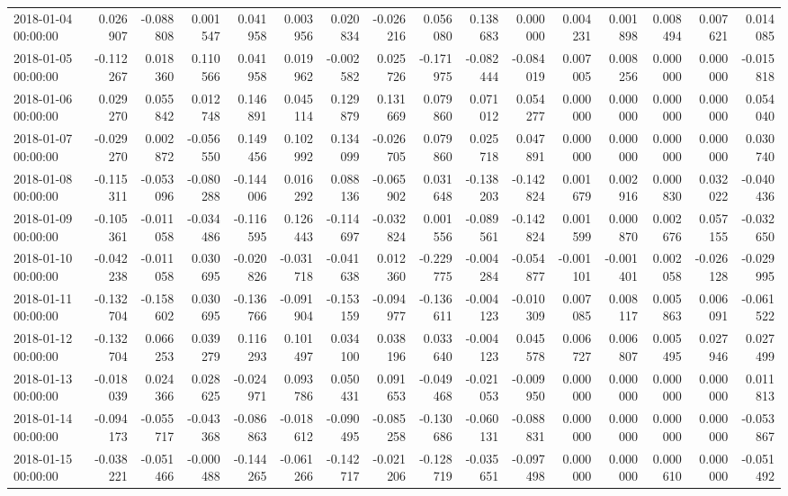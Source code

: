 \begin{tabular}{lrrrrrrrrrrrrrrr}
2018-01-04 00:00:00 & 0.026907 & -0.088808 & 0.001547 & 0.041958 & 0.003956 & 0.020834 & -0.026216 & 0.056080 & 0.138683 & 0.000000 & 0.004231 & 0.001898 & 0.008494 & 0.007621 & 0.014085 \\
2018-01-05 00:00:00 & -0.112267 & 0.018360 & 0.110566 & 0.041958 & 0.019962 & -0.002582 & 0.025726 & -0.171975 & -0.082444 & -0.084019 & 0.007005 & 0.008256 & 0.000000 & 0.000000 & -0.015818 \\
2018-01-06 00:00:00 & 0.029270 & 0.055842 & 0.012748 & 0.146891 & 0.045114 & 0.129879 & 0.131669 & 0.079860 & 0.071012 & 0.054277 & 0.000000 & 0.000000 & 0.000000 & 0.000000 & 0.054040 \\
2018-01-07 00:00:00 & -0.029270 & 0.002872 & -0.056550 & 0.149456 & 0.102992 & 0.134099 & -0.026705 & 0.079860 & 0.025718 & 0.047891 & 0.000000 & 0.000000 & 0.000000 & 0.000000 & 0.030740 \\
2018-01-08 00:00:00 & -0.115311 & -0.053096 & -0.080288 & -0.144006 & 0.016292 & 0.088136 & -0.065902 & 0.031648 & -0.138203 & -0.142824 & 0.001679 & 0.002916 & 0.000830 & 0.032022 & -0.040436 \\
2018-01-09 00:00:00 & -0.105361 & -0.011058 & -0.034486 & -0.116595 & 0.126443 & -0.114697 & -0.032824 & 0.001556 & -0.089561 & -0.142824 & 0.001599 & 0.000870 & 0.002676 & 0.057155 & -0.032650 \\
2018-01-10 00:00:00 & -0.042238 & -0.011058 & 0.030695 & -0.020826 & -0.031718 & -0.041638 & 0.012360 & -0.229775 & -0.004284 & -0.054877 & -0.001101 & -0.001401 & 0.002058 & -0.026128 & -0.029995 \\
2018-01-11 00:00:00 & -0.132704 & -0.158602 & 0.030695 & -0.136766 & -0.091904 & -0.153159 & -0.094977 & -0.136611 & -0.004123 & -0.010309 & 0.007085 & 0.008117 & 0.005863 & 0.006091 & -0.061522 \\
2018-01-12 00:00:00 & -0.132704 & 0.066253 & 0.039279 & 0.116293 & 0.101497 & 0.034100 & 0.038196 & 0.033640 & -0.004123 & 0.045578 & 0.006727 & 0.006807 & 0.005495 & 0.027946 & 0.027499 \\
2018-01-13 00:00:00 & -0.018039 & 0.024366 & 0.028625 & -0.024971 & 0.093786 & 0.050431 & 0.091653 & -0.049468 & -0.021053 & -0.009950 & 0.000000 & 0.000000 & 0.000000 & 0.000000 & 0.011813 \\
2018-01-14 00:00:00 & -0.094173 & -0.055717 & -0.043368 & -0.086863 & -0.018612 & -0.090495 & -0.085258 & -0.130686 & -0.060131 & -0.088831 & 0.000000 & 0.000000 & 0.000000 & 0.000000 & -0.053867 \\
2018-01-15 00:00:00 & -0.038221 & -0.051466 & -0.000488 & -0.144265 & -0.061266 & -0.142717 & -0.021206 & -0.128719 & -0.035651 & -0.097498 & 0.000000 & 0.000000 & 0.000610 & 0.000000 & -0.051492 \\

\end{tabular}
